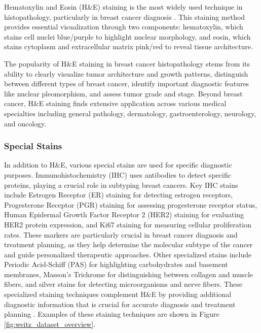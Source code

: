 Hematoxylin and Eosin (H\&E) staining is the most widely used
technique in histopathology, particularly in breast cancer diagnosis
\cite{PanEtAl2021}. This staining method provides essential visualization
through two components: hematoxylin, which stains cell nuclei
blue/purple to highlight nuclear morphology, and eosin, which stains
cytoplasm and extracellular matrix pink/red to reveal tissue architecture.

The popularity of H\&E staining in breast cancer histopathology stems
from its ability to clearly visualize tumor architecture and growth
patterns, distinguish between different types of breast cancer,
identify important diagnostic features like nuclear pleomorphism, and
assess tumor grade and stage. Beyond breast cancer, H\&E staining
finds extensive application across various medical specialties
including general pathology, dermatology, gastroenterology,
neurology, and oncology.

\subsubsection{Special Stains}

In addition to H\&E, various special stains are used for specific
diagnostic purposes. Immunohistochemistry (IHC) uses antibodies to
detect specific proteins, playing a crucial role in subtyping breast
cancers. Key IHC stains include Estrogen Receptor (ER) staining for detecting
estrogen receptors, Progesterone Receptor (PGR) staining for assessing
progesterone receptor status, Human Epidermal Growth Factor Receptor 2
(HER2) staining for evaluating HER2 protein expression, and Ki67
staining for measuring cellular proliferation rates. These markers are
particularly crucial in breast cancer diagnosis and treatment planning,
as they help determine the molecular subtype of the cancer and guide
personalized therapeutic approaches. Other specialized stains include
Periodic Acid-Schiff (PAS) for highlighting carbohydrates and basement
membranes, Masson's Trichrome for distinguishing between collagen and
muscle fibers, and silver stains for detecting microorganisms and
nerve fibers. These specialized staining techniques complement H\&E
by providing additional diagnostic information that is crucial for
accurate diagnosis and treatment planning \cite{WeitzEtAl2023}.
Examples of these staining techniques are shown in Figure
\ref{fig:weitz_dataset_overview}.

